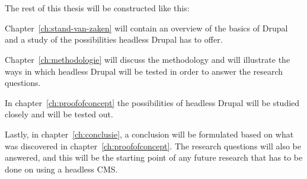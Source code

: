 \section{}
\label{sec:opzet-bachelorproef}


The rest of this thesis will be constructed like this:

Chapter~\ref{ch:stand-van-zaken} will contain an overview of the basics of Drupal and a study of the possibilities headless Drupal has to offer.

Chapter~\ref{ch:methodologie} will discuss the methodology and will illustrate the ways in which headless Drupal will be tested in order to answer the research questions.

In chapter~\ref{ch:proofofconcept} the possibilities of headless Drupal will be studied closely and will be tested out. 


Lastly, in chapter~\ref{ch:conclusie}, a conclusion will be formulated based on what was discovered in chapter~\ref{ch:proofofconcept}. The research questions will also be answered, and this will be the starting point of any future research that has to be done on using a headless CMS.